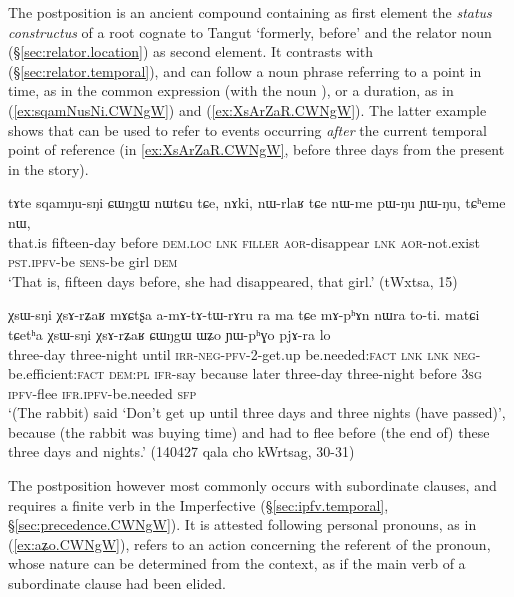 The postposition   is an ancient compound containing as first element the \textit{status constructus} of a root cognate to Tangut  `formerly, before' and the relator noun  (§\ref{sec:relator.location}) as second element. It contrasts with   (§\ref{sec:relator.temporal}), and can follow a noun phrase referring to a point in time, as in the common expression  (with the noun  ), or a duration, as in (\ref{ex:sqamNusNi.CWNgW}) and (\ref{ex:XsArZaR.CWNgW}). The latter example shows that  can be used to refer to events occurring \textit{after} the current temporal point of reference (in \ref{ex:XsArZaR.CWNgW}, before three days from the present in the story).

\begin{exe}
\ex \label{ex:sqamNusNi.CWNgW}
 \gll tɤte sqamŋu-sŋi ɕɯŋgɯ nɯtɕu tɕe, nɤki, nɯ-rlaʁ tɕe nɯ-me pɯ-ŋu ɲɯ-ŋu, tɕʰeme nɯ, \\
 that.is fifteen-day before \textsc{dem}.\textsc{loc} \textsc{lnk} \textsc{filler} \textsc{aor}-disappear \textsc{lnk} \textsc{aor}-not.exist \textsc{pst}.\textsc{ipfv}-be \textsc{sens}-be girl \textsc{dem} \\
 \glt `That is, fifteen days before, she had disappeared, that girl.' (tWxtsa, 15)
\end{exe}


\begin{exe}
\ex \label{ex:XsArZaR.CWNgW}
 \gll χsɯ-sŋi χsɤ-rʑaʁ mɤɕtʂa a-mɤ-tɤ-tɯ-rɤru ra ma tɕe mɤ-pʰɤn nɯra to-ti. matɕi tɕetʰa χsɯ-sŋi χsɤ-rʑaʁ ɕɯŋgɯ ɯʑo ɲɯ-pʰɣo pjɤ-ra lo \\
 three-day  three-night until \textsc{irr}-\textsc{neg}-\textsc{pfv}-2-get.up be.needed:\textsc{fact} \textsc{lnk} \textsc{lnk}  \textsc{neg}-be.efficient:\textsc{fact} \textsc{dem}:\textsc{pl} \textsc{ifr}-say because later   three-day  three-night before \textsc{3sg} \textsc{ipfv}-flee \textsc{ifr}.\textsc{ipfv}-be.needed \textsc{sfp} \\
 \glt `(The rabbit) said `Don't get up until three days and three nights (have passed)', because (the rabbit was buying time) and had to flee before (the end of) these three days and nights.' (140427 qala cho kWrtsag, 30-31)
\end{exe}

The postposition    however most commonly occurs with subordinate clauses, and requires a finite verb in the Imperfective (§\ref{sec:ipfv.temporal}, §\ref{sec:precedence.CWNgW}). It is attested following personal pronouns, as in (\ref{ex:aʑo.CWNgW}),   refers to an action concerning the referent of the pronoun, whose nature can be determined from the context, as if the main verb of a subordinate clause had been elided.

